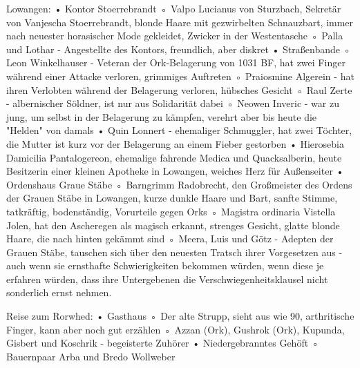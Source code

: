 




Lowangen:
    • Kontor Stoerrebrandt
        ◦ Valpo Lucianus von Sturzbach, Sekretär von Vanjescha Stoerrebrandt, blonde Haare mit gezwirbelten Schnauzbart, immer nach neuester horasischer Mode gekleidet, Zwicker in der Westentasche
        ◦ Palla und Lothar - Angestellte des Kontors, freundlich, aber diskret
    • Straßenbande
        ◦ Leon Winkelhauser - Veteran der Ork-Belagerung von 1031 BF, hat zwei Finger während einer Attacke verloren, grimmiges Auftreten
        ◦ Praiosmine Algerein - hat ihren Verlobten während der Belagerung verloren, hübsches Gesicht
        ◦ Raul Zerte - albernischer Söldner, ist nur aus Solidarität dabei
        ◦ Neowen Inveric - war zu jung, um selbst in der Belagerung zu kämpfen, verehrt aber bis heute die "Helden" von damals
    • Quin Lonnert - ehemaliger Schmuggler, hat zwei Töchter, die Mutter ist kurz vor der Belagerung an einem Fieber gestorben
    • Hierosebia Damicilia Pantalogereon, ehemalige fahrende Medica und Quacksalberin, heute Besitzerin einer kleinen Apotheke in Lowangen, weiches Herz für Außenseiter
    • Ordenshaus Graue Stäbe
        ◦ Barngrimm Radobrecht, den Großmeister des Ordens der Grauen Stäbe in Lowangen, kurze dunkle Haare und Bart, sanfte Stimme, tatkräftig, bodenständig, Vorurteile gegen Orks
        ◦ Magistra ordinaria Vistella Jolen, hat den Ascheregen als magisch erkannt, strenges Gesicht, glatte blonde Haare, die nach hinten gekämmt sind
        ◦ Meera, Luis und Götz - Adepten der Grauen Stäbe, tauschen sich über den neuesten Tratsch ihrer Vorgesetzen aus - auch wenn sie ernsthafte Schwierigkeiten bekommen würden, wenn diese je erfahren würden, dass ihre Untergebenen die Verschwiegenheitsklausel nicht sonderlich ernst nehmen.

Reise zum Rorwhed:
    • Gasthaus
        ◦ Der alte Strupp, sieht aus wie 90, arthritische Finger, kann aber noch gut erzählen
        ◦ Azzan (Ork), Gushrok (Ork), Kupunda, Gisbert und Koschrik - begeisterte Zuhörer
    • Niedergebranntes Gehöft
        ◦ Bauernpaar Arba und Bredo Wollweber

